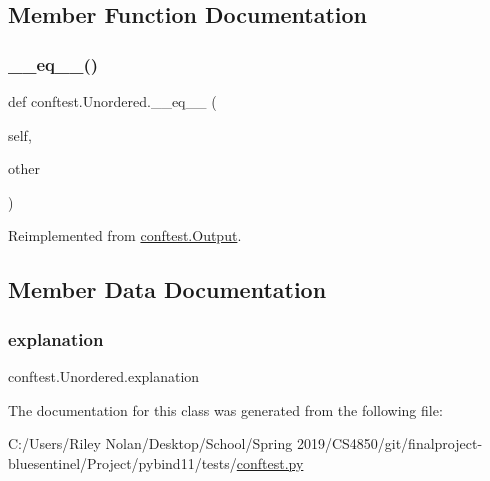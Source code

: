 \subsection{Member Function Documentation}
\mbox{\label{classconftest_1_1_unordered_a51a62b504cc6d896bb863a8badcd1fdf}} 
\subsubsection{\texorpdfstring{\_\_eq\_\_()}{\_\_eq\_\_()}}
{\footnotesize\ttfamily def conftest.\+Unordered.\+\_\+\+\_\+eq\+\_\+\+\_\+ (\begin{DoxyParamCaption}\item[{}]{self,  }\item[{}]{other }\end{DoxyParamCaption})}



Reimplemented from \mbox{\hyperlink{classconftest_1_1_output_af2d5081d359504c97a4e83d316824f05}{conftest.\+Output}}.



\subsection{Member Data Documentation}
\mbox{\label{classconftest_1_1_unordered_abd5e38f442dadce7c2f2e7ed059557e4}} 
\subsubsection{\texorpdfstring{explanation}{explanation}}
{\footnotesize\ttfamily conftest.\+Unordered.\+explanation}



The documentation for this class was generated from the following file\+:\begin{DoxyCompactItemize}
\item 
C\+:/\+Users/\+Riley Nolan/\+Desktop/\+School/\+Spring 2019/\+C\+S4850/git/finalproject-\/bluesentinel/\+Project/pybind11/tests/\mbox{\hyperlink{conftest_8py}{conftest.\+py}}\end{DoxyCompactItemize}
